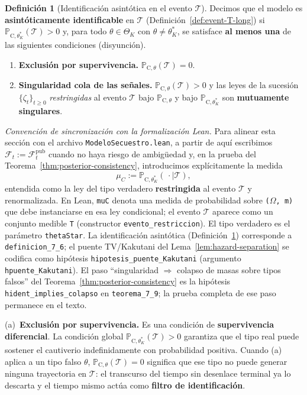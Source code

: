 \documentclass[12pt]{article}
\theoremstyle{definition}
\newtheorem{definition}[theorem]{Definición}
\theoremstyle{remark}
\newcommand{\ProbC}[1]{\mathbb{P}_{\mathrm{C},#1}}
\newcommand{\1}{\mathbf{1}}
\begin{document}
\begin{definition}[Identificación asintótica en el evento $\mathcal{T}$]
\label{def:asymptotic-id}
Decimos que el modelo es \textbf{asintóticamente identificable} en $\mathcal{T}$ \textup{(}Definición~\ref{def:event-T-long}\textup{)} si $\ProbC{\theta_K^\ast}(\mathcal{T})>0$ y, para todo $\theta\in\Theta_K$ con $\theta\neq\theta_K^\ast$, se satisface \textbf{al menos una} de las siguientes condiciones \textup{(}disyunción\textup{)}.
\begin{enumerate}
  \item[\textup{(a)}] \textbf{Exclusión por supervivencia.} $\ProbC{\theta}(\mathcal{T})=0$.
  \item[\textup{(b)}] \textbf{Singularidad cola de las señales.} $\ProbC{\theta}(\mathcal{T})>0$ y las leyes de la sucesión $\{\zeta_t\}_{t\ge 0}$ \emph{restringidas} al evento $\mathcal{T}$ bajo $\ProbC{\theta}$ y bajo $\ProbC{\theta_K^\ast}$ son \textbf{mutuamente singulares}.
\end{enumerate}
\end{definition}

\noindent\textit{Convención de sincronización con la formalización Lean.} Para alinear esta sección con el archivo \texttt{ModeloSecuestro.lean}, a partir de aquí escribimos $\mathcal{F}_t:=\mathcal{F}_t^{\mathrm{pub}}$ cuando no haya riesgo de ambigüedad y, en la prueba del Teorema~\ref{thm:posterior-consistency}, introducimos explícitamente la medida
\[
\mu_C:=\ProbC{\theta_K^\ast}(\,\cdot\mid \mathcal{T}),
\]
entendida como la ley del tipo verdadero \textbf{restringida} al evento $\mathcal{T}$ y renormalizada. En Lean, \texttt{muC} denota una medida de probabilidad sobre \texttt{(}$\Omega$\texttt{, m)} que debe instanciarse en esa ley condicional; el evento $\mathcal{T}$ aparece como un conjunto medible \texttt{T} \textup{(}constructor \texttt{evento\_restriccion}\textup{)}. El tipo verdadero es el parámetro \texttt{thetaStar}. La identificación asintótica \textup{(}Definición~\ref{def:asymptotic-id}\textup{)} corresponde a \texttt{definicion\_7\_6}; el puente TV/Kakutani del Lema~\ref{lem:hazard-separation} se codifica como hipótesis \texttt{hipotesis\_puente\_Kakutani} \textup{(}argumento \texttt{hpuente\_Kakutani}\textup{)}. El paso ``singularidad $\Rightarrow$ colapso de masas sobre tipos falsos'' del Teorema~\ref{thm:posterior-consistency} es la hipótesis \texttt{hident\_implies\_colapso} en \texttt{teorema\_7\_9}; la prueba completa de ese paso permanece en el texto.


\textup{(a)}~\textbf{Exclusión por supervivencia.} Es una condición de \textbf{supervivencia diferencial}. La condición global $\ProbC{\theta_K^\ast}(\mathcal{T})>0$ garantiza que el tipo real puede sostener el cautiverio indefinidamente con probabilidad positiva. Cuando (a) aplica a un tipo falso $\theta$, $\ProbC{\theta}(\mathcal{T})=0$ significa que ese tipo no puede generar ninguna trayectoria en $\mathcal{T}$: el transcurso del tiempo sin desenlace terminal ya lo descarta y el tiempo mismo actúa como \textbf{filtro de identificación}.
\end{document}
